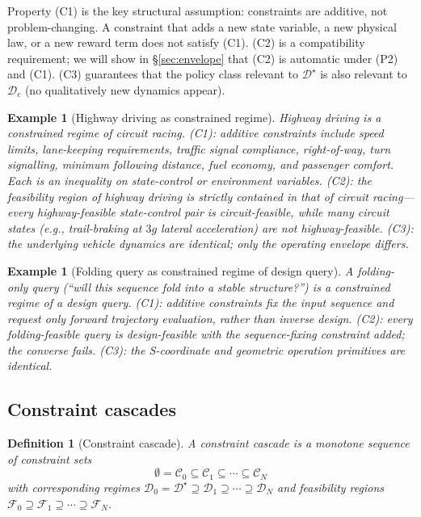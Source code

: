 \documentclass[twocolumn,11pt,a4paper]{article}
\newtheorem{definition}[theorem]{Definition}
\newtheorem{example}[theorem]{Example}
\newcommand{\cD}{\mathcal{D}}
\newcommand{\cF}{\mathcal{F}}
\newcommand{\cC}{\mathcal{C}}
\begin{document}
Property (C1) is the key structural assumption: constraints are additive, not problem-changing. A constraint that adds a new state variable, a new physical law, or a new reward term does not satisfy (C1). (C2) is a compatibility requirement; we will show in \S\ref{sec:envelope} that (C2) is automatic under (P2) and (C1). (C3) guarantees that the policy class relevant to $\cD^\star$ is also relevant to $\cD_c$ (no qualitatively new dynamics appear).

\begin{example}[Highway driving as constrained regime]
\label{ex:highway}
Highway driving is a constrained regime of circuit racing. (C1): additive constraints include speed limits, lane-keeping requirements, traffic signal compliance, right-of-way, turn signalling, minimum following distance, fuel economy, and passenger comfort. Each is an inequality on state-control or environment variables. (C2): the feasibility region of highway driving is strictly contained in that of circuit racing---every highway-feasible state-control pair is circuit-feasible, while many circuit states (e.g., trail-braking at $3g$ lateral acceleration) are not highway-feasible. (C3): the underlying vehicle dynamics are identical; only the operating envelope differs.
\end{example}

\begin{example}[Folding query as constrained regime of design query]
\label{ex:folding}
A folding-only query (``will this sequence fold into a stable structure?'') is a constrained regime of a design query. (C1): additive constraints fix the input sequence and request only forward trajectory evaluation, rather than inverse design. (C2): every folding-feasible query is design-feasible with the sequence-fixing constraint added; the converse fails. (C3): the S-coordinate and geometric operation primitives are identical.
\end{example}

\subsection{Constraint cascades}

\begin{definition}[Constraint cascade]
\label{def:cascade}
A \emph{constraint cascade} is a monotone sequence of constraint sets
\begin{equation}
\emptyset = \cC_0 \subseteq \cC_1 \subseteq \cdots \subseteq \cC_N
\end{equation}
with corresponding regimes $\cD_0 = \cD^\star \supseteq \cD_1 \supseteq \cdots \supseteq \cD_N$ and feasibility regions $\cF_0 \supseteq \cF_1 \supseteq \cdots \supseteq \cF_N$.
\end{definition}
\end{document}
